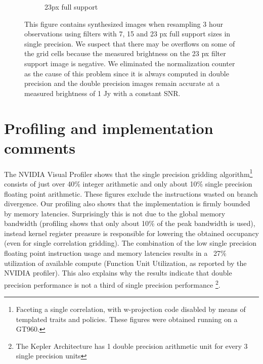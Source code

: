 \begin{figure}[ht!]
\begin{mdframed}
\begin{subfigure}[b]{0.45\textwidth}
      \caption{23px full support}
    \end{subfigure}
    \caption[Precision error in simulated 3 hour MeerKAT observations]{This figure contains synthesized images when resampling 3 hour observations using filters with 7, 15 and 23 px full support sizes in single precision. We suspect 
    that there may be overflows on some of the grid cells because the measured brightness on the 23 px filter support image is negative. We eliminated the normalization counter as the cause of this problem since it is always computed in double precision
    and the double precision images remain accurate at a measured brightness of 1 Jy with a constant SNR.}
    \label{FIG_PREC_ERROR_IMAGES}
 \end{mdframed}
\end{figure}

\section{Profiling and implementation comments}
The NVIDIA Visual Profiler shows that the single precision gridding algorithm\footnote{Faceting a single correlation, with w-projection code disabled by means of templated 
traits and policies. These figures were obtained running on a GT960.} consists of just over 40\% integer arithmetic and only about 10\% single precision floating point arithmetic. These figures exclude the instructions wasted
on branch divergence. Our profiling also shows that the implementation is firmly bounded by memory latencies. Surprisingly this is not due to the global memory bandwidth 
(profiling shows that only about 10\% of the peak bandwidth is used), instead kernel register preasure is responsible for lowering the 
obtained occupancy (even for single correlation gridding). The combination of the low single precision floating point instruction usage 
and memory latencies results in a ~27\% utilization of available compute (Function Unit Utilization, as reported by the NVIDIA profiler). This 
also explains why the results indicate that double precision performance is not a third of single precision performance \footnote{The Kepler Architecture 
has 1 double precision arithmetic unit for every 3 single precision units}.

